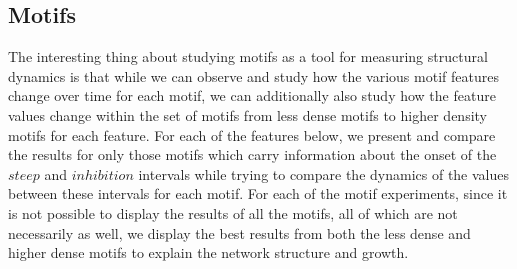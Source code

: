 \documentclass[smallextended]{svjour3}       %
\theoremstyle{definition}
\begin{document}
 \subsection{Motifs}
The interesting thing about studying motifs as a tool for measuring structural dynamics is that while we can observe and study how the various motif features change over time for each motif, we can additionally also study how the feature values change within the set of motifs from less dense motifs to higher density motifs for each feature. For each of the features below, we present and compare the results for only those motifs which carry information about the onset of the $steep$ and $inhibition$ intervals while trying to compare the dynamics of the values between these intervals for each motif. For each of the motif experiments, since it is not possible to display the results of all the motifs, all of which are not necessarily as well, we display the best results from both the less dense and higher dense motifs to explain the network structure and growth.
\end{document}
